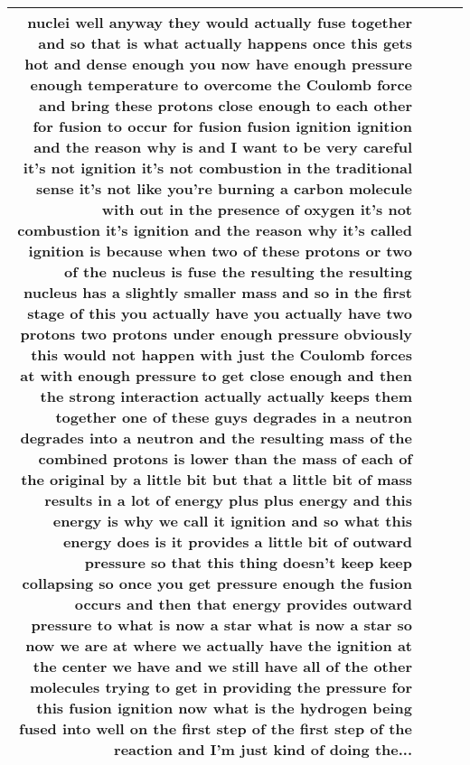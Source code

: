 \documentclass[10pt]{article}
\begin{document}
\begin{tiny}
\begin{longtable}{|r|p{0.375in}|p{1.275in}|p{3.5in}|}
nuclei well anyway they would actually fuse together and so that is what actually happens once this gets hot and dense enough you now have enough pressure enough temperature to overcome the Coulomb force and bring these protons close enough to each other for fusion to occur for fusion fusion ignition ignition and the reason why is and I want to be very careful it's not ignition it's not combustion in the traditional sense it's not like you're burning a carbon molecule with out in the presence of oxygen it's not combustion it's ignition and the reason why it's called ignition is because when two of these protons or two of the nucleus is fuse the resulting the resulting nucleus has a slightly smaller mass and so in the first stage of this you actually have you actually have two protons two protons under enough pressure obviously this would not happen with just the Coulomb forces at with enough pressure to get close enough and then the strong interaction actually actually keeps them together one of these guys degrades in a neutron degrades into a neutron and the resulting mass of the combined protons is lower than the mass of each of the original by a little bit but that a little bit of mass results in a lot of energy plus plus energy and this energy is why we call it ignition and so what this energy does is it provides a little bit of outward pressure so that this thing doesn't keep keep collapsing so once you get pressure enough the fusion occurs and then that energy provides outward pressure to what is now a star what is now a star so now we are at where we actually have the ignition at the center we have and we still have all of the other molecules trying to get in providing the pressure for this fusion ignition now what is the hydrogen being fused into well on the first step of the first step of the reaction and I'm just kind of doing the... \\\hline

\end{longtable}
\end{tiny}
\end{document}
